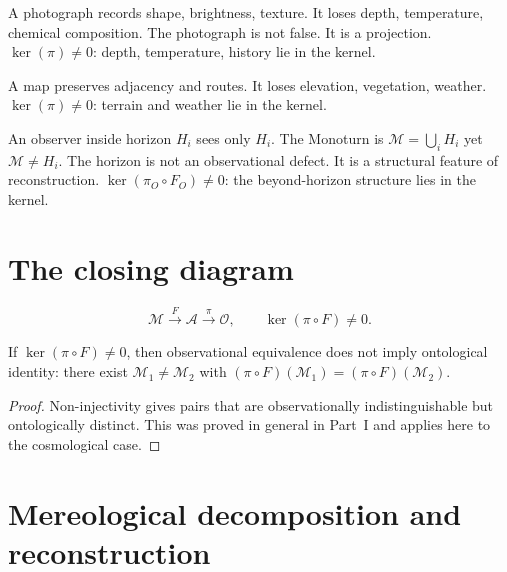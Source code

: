 \begin{WorkedExample}[Photograph]
  A photograph records shape, brightness, texture.
  It loses depth, temperature, chemical composition.
  The photograph is not false. It is a projection.
  $\ker(\pi) \neq 0$: depth, temperature, history lie in the kernel.
\end{WorkedExample}

\begin{WorkedExample}[Map]
  A map preserves adjacency and routes.
  It loses elevation, vegetation, weather.
  $\ker(\pi) \neq 0$: terrain and weather lie in the kernel.
\end{WorkedExample}

\begin{WorkedExample}
  An observer inside horizon $H_i$ sees only $H_i$.
  The Monoturn is $\mathcal{M} = \bigcup_i H_i$
  yet $\mathcal{M} \neq H_i$.
  The horizon is not an observational defect.
  It is a structural feature of reconstruction.
  $\ker(\pi_O \circ F_O) \neq 0$: the beyond-horizon structure
  lies in the kernel.
\end{WorkedExample}

\section{The closing diagram}

\[
  \mathcal{M}
  \xrightarrow{F}
  \mathcal{A}
  \xrightarrow{\pi}
  \mathcal{O},
  \qquad
  \ker(\pi \circ F) \neq 0.
\]

\begin{proposition}
  \label{prop:obs-onto}
  \statusproven{}
  If $\ker(\pi \circ F) \neq 0$, then observational equivalence
  does not imply ontological identity:
  there exist $\mathcal{M}_1 \neq \mathcal{M}_2$ with
  $(\pi \circ F)(\mathcal{M}_1) = (\pi \circ F)(\mathcal{M}_2)$.
\end{proposition}

\begin{proof}
  Non-injectivity gives pairs that are observationally
  indistinguishable but ontologically distinct.
  This was proved in general in Part~I and applies here to
  the cosmological case.
\end{proof}

\section{Mereological decomposition and reconstruction}

